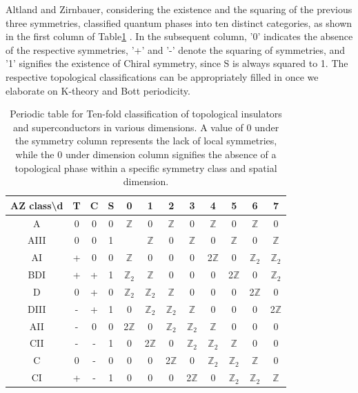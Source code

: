 Altland and Zirnbauer, considering the existence and the squaring of the previous three symmetries, classified quantum phases into ten distinct categories, as shown in the first column of Table\ref{tab:10fold} \cite{altland1997nonstandard}. In the subsequent column, '0' indicates the absence of the respective symmetries, '+' and '-' denote the squaring of symmetries, and '1' signifies the existence of Chiral symmetry, since S is always squared to 1. The respective topological classifications can be appropriately filled in once we elaborate on K-theory and Bott periodicity.


\begin{table}[h]
\label{tab:10fold}
\begin{tabular}{|c|ccc|cccccccc|}
\hline
AZ class\textbackslash d & T & C & S & 0 & 1 & 2 & 3 & 4 & 5 & 6 & 7 \\ \hline
A                        & 0 & 0 & 0 & $\mathbb{Z}$  & 0   &$\mathbb{Z}$  &0   &$\mathbb{Z}$  &0   &$\mathbb{Z}$   &0   \\
AIII                     & 0 & 0 & 1 &   &$\mathbb{Z}$   &0   &$\mathbb{Z}$   &0   &$\mathbb{Z}$   &0   &$\mathbb{Z}$   \\ \hline
AI                       & + & 0 & 0 &$\mathbb{Z}$   &0   &0   &0   &2$\mathbb{Z}$   &0   &$\mathbb{Z}_2$   &$\mathbb{Z}_2$   \\
BDI                      & + & + & 1 &$\mathbb{Z}_2$   &$\mathbb{Z}$   &0   &0   &0   &2$\mathbb{Z}$   &0   &$\mathbb{Z}_2$   \\
D                        & 0 & + & 0 &$\mathbb{Z}_2$   &$\mathbb{Z}_2$   &$\mathbb{Z}$   &0   &0   &0   &2$\mathbb{Z}$   &0   \\
DIII                     & - & + & 1 &0   &$\mathbb{Z}_2$   &$\mathbb{Z}_2$   &$\mathbb{Z}$   &0   &0   &0   &2$\mathbb{Z}$   \\
AII                      & - & 0 & 0 &2$\mathbb{Z}$   &0   &$\mathbb{Z}_2$   &$\mathbb{Z}_2$   &$\mathbb{Z}$   &0   &0   &0   \\
CII                      & - & - & 1 &0   &2$\mathbb{Z}$   &0   &$\mathbb{Z}_2$   &$\mathbb{Z}_2$   &$\mathbb{Z}$   &0   &0   \\
C                        & 0 & - & 0 &0   &0   &2$\mathbb{Z}$   &0   &$\mathbb{Z}_2$   &$\mathbb{Z}_2$   &$\mathbb{Z}$   & 0  \\
CI                       & + & - & 1 &0   &0   &0   &2$\mathbb{Z}$   &0   &$\mathbb{Z}_2$   &$\mathbb{Z}_2$   &$\mathbb{Z}$  \\
\hline
\end{tabular}
\caption{Periodic table for Ten-fold classification of topological insulators and superconductors in various dimensions. A value of 0 under the symmetry column represents the lack of local symmetries, while the 0 under dimension column signifies the absence of a topological phase within a specific symmetry class and spatial dimension.}
\end{table}


